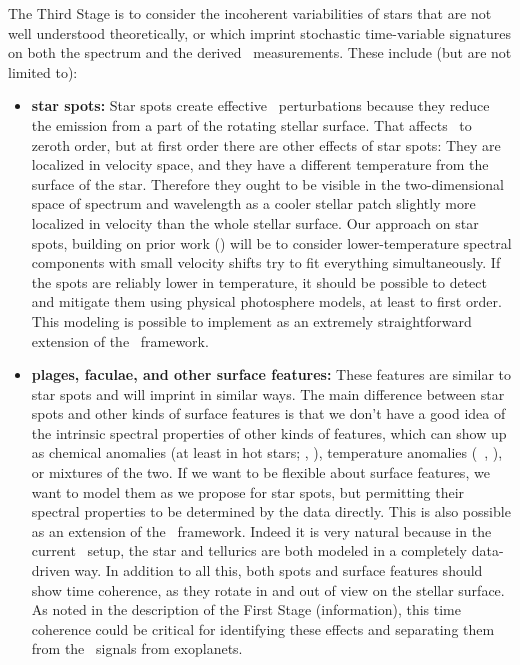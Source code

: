 \documentclass[12pt, letterpaper]{article}
\begin{document}
The Third Stage is to consider the incoherent variabilities of stars
that are not well understood theoretically, or which imprint
stochastic time-variable signatures on both the spectrum and the
derived \RV\ measurements.
These include (but are not limited to):
\begin{itemize}
\item
\textbf{star spots:}
Star spots create effective \RV\ perturbations because they reduce the
emission from a part of the rotating stellar surface.
That affects \EPRV\ to zeroth order, but at first order there are other
effects of star spots:
They are localized in velocity space, and they have a different
temperature from the surface of the star.
Therefore they ought to be visible in the two-dimensional space of
spectrum and wavelength as a cooler stellar patch slightly more
localized in velocity than the whole stellar surface.
Our approach on star spots, building on prior work (\citealt{Gully}) will
be to consider lower-temperature spectral components with small
velocity shifts try to fit everything simultaneously.
If the spots are reliably lower in temperature, it should be possible
to detect and mitigate them using physical photosphere models, at
least to first order.
This modeling is possible to implement as an extremely straightforward
extension of the \wobble\ framework.
\item
\textbf{plages, faculae, and other surface features:}
These features are similar to star spots and will imprint in similar
ways.
The main difference between star spots and other kinds of surface
features is that we don't have a good idea of the intrinsic spectral
properties of other kinds of features, which can show up as chemical
anomalies (at least in hot stars; \eg, \citealt{doppler}),
temperature anomalies (\eg\ \citealt{Gully}, \citealt{Milbourne2019}),
or mixtures of the two.
If we want to be flexible about surface features, we want to model
them as we propose for star spots, but permitting their spectral
properties to be determined by the data directly.
This is also possible as an extension of the \wobble\ framework.
Indeed it is very natural because in the current \wobble\ setup, the
star and tellurics are both modeled in a completely data-driven way.
In addition to all this, both spots and surface features should show
time coherence, as they rotate in and out of view on the stellar
surface.
As noted in the description of the First Stage (information), this
time coherence could be critical for identifying these effects and
separating them from the \RV\ signals from exoplanets.

\end{itemize}
\end{document}
